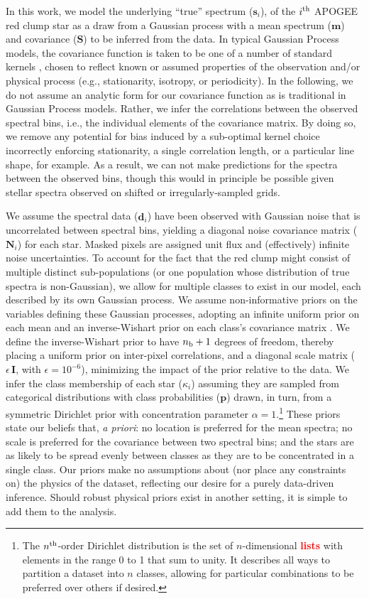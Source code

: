 \documentclass[a4paper,fleqn,usenatbib]{mnras}
\newcommand{\nb}{n_{\rm b}}
\newcommand{\specmean}{{\bm m}}
\newcommand{\speccov}{{\bm S}}
\newcommand{\classprobs}{{\bm p}}
\newcommand{\objspec}{{\bm s}}
\newcommand{\objclass}{{\kappa}}
\newcommand{\objdata}{\hat{\bm d}}
\newcommand{\objnoise}{{\bm N}}
\newcommand{\identity}{{\bm I}}
\newcommand\edit[1]{\textcolor{red}{\textbf{#1}}}
\begin{document}
In this work, we model the underlying ``true'' spectrum ($\objspec_i$), of the $i^{\rm th}$ APOGEE red clump star as a draw from a Gaussian process with a mean spectrum ($\specmean$) and covariance ($\speccov$) to be inferred from the data. In typical Gaussian Process models, the covariance function is taken to be one of a number of standard kernels \citep{Rasmussen_Williams}, chosen to reflect known or assumed properties of the observation and/or physical process (e.g., stationarity, isotropy, or periodicity). In the following, we do not assume an analytic form for our covariance function as is traditional in Gaussian Process models. Rather, we infer the correlations between the observed spectral bins, i.e., the individual elements of the covariance matrix. By doing so, we remove any potential for bias induced by a sub-optimal kernel choice incorrectly enforcing stationarity, a single correlation length, or a particular line shape, for example. As a result, we can not make predictions for the spectra between the observed bins, though this would in principle be possible given stellar spectra observed on shifted or irregularly-sampled grids.

We assume the spectral data ($\objdata_i$) have been observed with Gaussian noise that is uncorrelated between spectral bins, yielding a diagonal noise covariance matrix ($\objnoise_i$) for each star. Masked pixels are assigned unit flux and (effectively) infinite noise uncertainties. To account for the fact that the red clump might consist of multiple distinct sub-populations (or one population whose distribution of true spectra is non-Gaussian), we allow for multiple classes to exist in our model, each described by its own Gaussian process. We assume non-informative priors on the variables defining these Gaussian processes, adopting an infinite uniform prior on each mean and an inverse-Wishart prior on each class's covariance matrix \citep[p73]{Gelman_etal:2013}. We define the inverse-Wishart prior to have $\nb+1$ degrees of freedom, thereby placing a uniform prior on inter-pixel correlations, and a diagonal scale matrix ($\epsilon \, \identity$, with $\epsilon=10^{-6}$), minimizing the impact of the prior relative to the data. We infer the class membership of each star ($\objclass_i$) assuming they are sampled from categorical distributions with class probabilities ($\classprobs$) drawn, in turn, from a symmetric Dirichlet prior with concentration parameter $\alpha=1$.\footnote{The $n^{\rm th}$-order Dirichlet distribution is the set of $n$-dimensional \edit{lists} with elements in the range 0 to 1 that sum to unity. It describes all ways to partition a dataset into $n$ classes, allowing for particular combinations to be preferred over others if desired.} These priors state our beliefs that, {\it a priori}: no location is preferred for the mean spectra; no scale is preferred for the covariance between two spectral bins; and the stars are as likely to be spread evenly between classes as they are to be concentrated in a single class. Our priors make no assumptions about (nor place any constraints on) the physics of the dataset, reflecting our desire for a purely data-driven inference. Should robust physical priors exist in another setting, it is simple to add them to the analysis.
\end{document}
